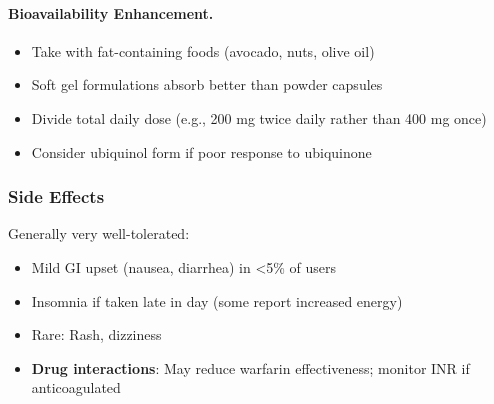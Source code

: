 \paragraph{Bioavailability Enhancement.}
\begin{itemize}
    \item Take with fat-containing foods (avocado, nuts, olive oil)
    \item Soft gel formulations absorb better than powder capsules
    \item Divide total daily dose (e.g., 200 mg twice daily rather than 400 mg once)
    \item Consider ubiquinol form if poor response to ubiquinone
\end{itemize}

\subsubsection{Side Effects}

Generally very well-tolerated:
\begin{itemize}
    \item Mild GI upset (nausea, diarrhea) in <5\% of users
    \item Insomnia if taken late in day (some report increased energy)
    \item Rare: Rash, dizziness
    \item \textbf{Drug interactions}: May reduce warfarin effectiveness; monitor INR if anticoagulated
\end{itemize}


